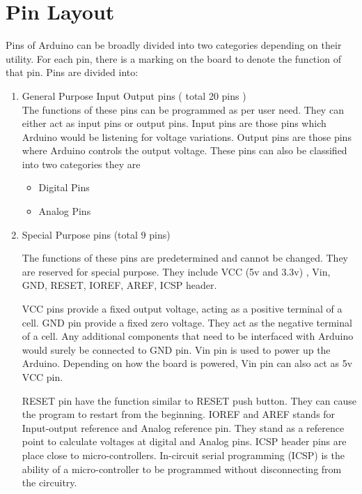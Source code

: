 \section{Pin Layout}
\par Pins of Arduino can be broadly divided into two categories depending on their utility. For each pin, there is a marking on the board to denote the function of that pin. Pins are divided into:
\begin{enumerate}
    \item General Purpose Input Output pins ( total 20 pins )\\ 
    The functions of these pins can be programmed as per user need. They can either act as input pins or output pins. Input pins are those pins which Arduino would be listening for voltage variations. Output pins are those pins where Arduino controls the output voltage. These pins can also be classified into two categories they are 
    \begin{itemize}
        \item Digital Pins
        \item Analog Pins
    \end{itemize}
    \item Special Purpose pins (total 9 pins)
    \par The functions of these pins are predetermined and cannot be changed. They are reserved for special purpose. They include VCC (5v and 3.3v) , Vin, GND, RESET, IOREF, AREF, ICSP header.
    
    \par VCC pins provide a fixed output voltage, acting as a positive terminal of a cell. GND pin provide a fixed zero voltage. They act as the negative terminal of a cell. Any additional components that need to be interfaced with Arduino would surely be connected to GND pin. Vin pin is used to power up the Arduino. Depending on how the board is powered, Vin pin can also act as 5v VCC pin.
    \par RESET pin have the function similar to RESET push button. They can cause the program to restart from the beginning. IOREF and AREF stands for Input-output reference and Analog reference pin. They stand as a reference point to calculate voltages at digital and Analog pins. ICSP header pins are place close to micro-controllers. In-circuit serial programming (ICSP) is the ability of a micro-controller to be programmed without disconnecting from the circuitry.
\end{enumerate}

